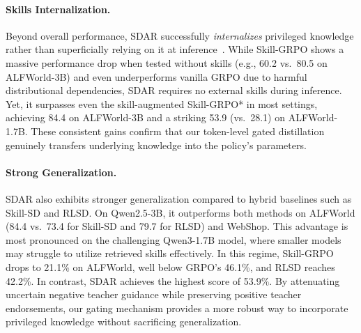 \documentclass{article} %
\newcommand{\methodname}{\textsc{SDAR}\xspace}
\begin{document}
\paragraph{Skills Internalization.}                                                           
Beyond overall performance, \methodname{} successfully \emph{internalizes} privileged knowledge rather than superficially relying on it at inference~\citep{lu2026skill0}. While Skill-GRPO shows a massive performance drop when tested without skills (e.g., 60.2 vs.\ 80.5 on ALFWorld-3B) and even underperforms vanilla GRPO due to harmful distributional dependencies, \methodname{} requires no external skills during inference. Yet, it surpasses even the skill-augmented Skill-GRPO* in most settings, achieving 84.4 on ALFWorld-3B and a striking 53.9 (vs.\ 28.1) on ALFWorld-1.7B. These consistent gains confirm that our token-level gated distillation genuinely transfers underlying knowledge into the policy's parameters.

\paragraph{Strong Generalization.}                                                            
\methodname{} also exhibits stronger generalization compared to hybrid baselines such as Skill-SD and RLSD.
On Qwen2.5-3B, it outperforms both methods on ALFWorld (84.4 vs.\ 73.4 for Skill-SD and 79.7 for RLSD) and WebShop.
This advantage is most pronounced on the challenging Qwen3-1.7B model, where smaller models may struggle to utilize retrieved skills effectively.
In this regime, Skill-GRPO drops to 21.1\% on ALFWorld, well below GRPO's 46.1\%, and RLSD reaches 42.2\%.
In contrast, \methodname{} achieves the highest score of 53.9\%.
By attenuating uncertain negative teacher guidance while preserving positive teacher endorsements, our gating mechanism provides a more robust way to incorporate privileged knowledge without sacrificing generalization.
\end{document}
